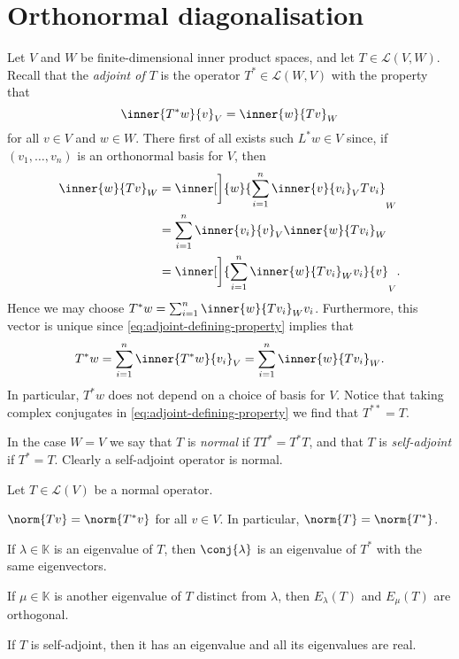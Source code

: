 \documentclass[article, a4paper, 11pt, oneside]{memoir}
\numberwithin{equation}{chapter}
\newcommand{\calL}{\mathcal{L}}
\begin{document}
\section{Orthonormal diagonalisation}

Let $V$ and $W$ be finite-dimensional inner product spaces, and let $T \in \calL(V,W)$. Recall that the \emph{adjoint of $T$} is the operator $T^* \in \calL(W,V)$ with the property that
%
\begin{equation}
    \label{eq:adjoint-defining-property}
    \inner{T^*w}{v}_V = \inner{w}{Tv}_W
\end{equation}
%
for all $v \in V$ and $w \in W$. There first of all exists such $L^*w \in V$ since, if $(v_1, \ldots, v_n)$ is an orthonormal basis for $V$, then
%
\begin{align*}
    \inner{w}{Tv}_W
        &= \inner[\bigg]{w}{\sum_{i=1}^n \inner{v}{v_i}_V Tv_i}_W \\
        &= \sum_{i=1}^n \inner{v_i}{v}_V \inner{w}{Tv_i}_W \\
        &= \inner[\bigg]{ \sum_{i=1}^n \inner{w}{Tv_i}_W v_i }{v}_V.
\end{align*}
%
Hence we may choose $T^*w = \sum_{i=1}^n \inner{w}{Tv_i}_W v_i$. Furthermore, this vector is unique since \cref{eq:adjoint-defining-property} implies that
%
\begin{equation*}
    T^*w
        = \sum_{i=1}^n \inner{T^*w}{v_i}_V
        = \sum_{i=1}^n \inner{w}{Tv_i}_W.
\end{equation*}
%
In particular, $T^*w$ does not depend on a choice of basis for $V$. Notice that taking complex conjugates in \cref{eq:adjoint-defining-property} we find that $T^{**} = T$.

In the case $W = V$ we say that $T$ is \emph{normal} if $TT^* = T^*T$, and that $T$ is \emph{self-adjoint} if $T^* = T$. Clearly a self-adjoint operator is normal.

\begin{proposition}
    Let $T \in \calL(V)$ be a normal operator.
    \begin{enumprop}
        \item $\norm{Tv} = \norm{T^*v}$ for all $v \in V$. In particular, $\norm{T} = \norm{T^*}$.
        
        \item If $\lambda \in \mathbb{K}$ is an eigenvalue of $T$, then $\conj{\lambda}$ is an eigenvalue of $T^*$ with the same eigenvectors.

        \item If $\mu \in \mathbb{K}$ is another eigenvalue of $T$ distinct from $\lambda$, then $E_\lambda(T)$ and $E_\mu(T)$ are orthogonal.

        \item If $T$ is self-adjoint, then it has an eigenvalue and all its eigenvalues are real.
    \end{enumprop}
\end{proposition}
\end{document}
